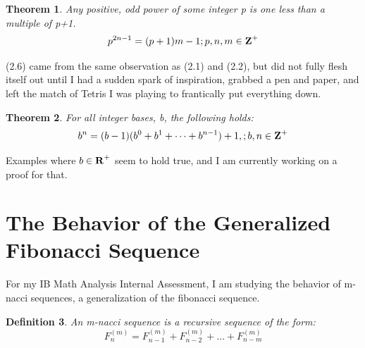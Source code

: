 \documentclass[11pt]{article}
\newtheorem{theorem}{Theorem}[section]
\newtheorem{definition}[theorem]{Definition}
\begin{document}
\begin{theorem}
    Any positive, odd power of some integer \mbox{p} is one less than a multiple of \mbox{p+1}. 
    $$p^{2n-1}=(p+1)m-1;p,n,m\in\mbox{\textbf{Z}}^+$$
\end{theorem}

(2.6) came from the same observation as (2.1) and (2.2), but did not fully flesh itself out until I had a sudden spark of inspiration, grabbed a pen and paper, and left the match of Tetris I was playing to frantically put everything down. 

\begin{theorem}
    For all integer bases, b, the following holds:
    $$b^n=(b-1)(b^0+b^1+\dots+b^{n-1})+1,;b,n\in\mbox{\textbf{Z}}^+$$
\end{theorem}

Examples where $b\in\mbox{\textbf{R}}^+$ seem to hold true, and I am currently working on a proof for that.


\section{The Behavior of the Generalized Fibonacci Sequence}

For my IB Math Analysis Internal Assessment, I am studying the behavior of m-nacci sequences, a generalization of the fibonacci sequence.

\begin{definition}
An m-nacci sequence is a recursive sequence of the form:
$$F^{(m)}_n=F^{(m)}_{n-1}+F^{(m)}_{n-2}+\dots+F^{(m)}_{n-m}$$
\end{definition}
\end{document}
